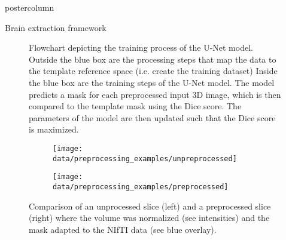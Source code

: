 \begin{frame}
\begin{columns}
\begin{column}{.42\textwidth}
\begin{beamercolorbox}[center]{postercolumn}
\begin{minipage}{.98\textwidth}
{\begin{myblock}{Brain extraction framework}
                                \begin{figure}
                                    \centering
                                    \vspace{0.5em}
                                    \caption{
                                        Flowchart depicting the training process of the U-Net model. Outside the blue box are the processing steps that map the data to the template reference space (i.e. create the training dataset)
                                        Inside the blue box are the training steps of the U-Net model.
                                        The model predicts a mask for each preprocessed input 3D image, which is then compared to the template mask using the Dice score. The parameters of the model are then updated such that the Dice score is maximized.
                                    }
                                    \label{training_graph}
                                \end{figure}

                                \vspace{-0.5em}

                                \begin{figure}
                                    \centering
                                    \begin{subfigure}{0.25\textwidth}
                                        \centering
                                        \texttt{[image: data/preprocessing\_examples/unpreprocessed]}
                                    \end{subfigure}
                                    \hspace{2em}
                                    \begin{subfigure}{0.25\textwidth}
                                        \centering
                                        \texttt{[image: data/preprocessing\_examples/preprocessed]}
                                    \end{subfigure}
                                    \vspace{-0.5em}
                                    \caption{Comparison of an unprocessed slice (left) and a preprocessed slice (right) where the volume was normalized (see intensities) and the mask adapted to the NIfTI data (see blue overlay).}
                                    \label{preprocessing_xample}
                                \end{figure}
                            \end{myblock}\vfill





}
\end{minipage}
\end{beamercolorbox}
\end{column}
\end{columns}
\end{frame}
